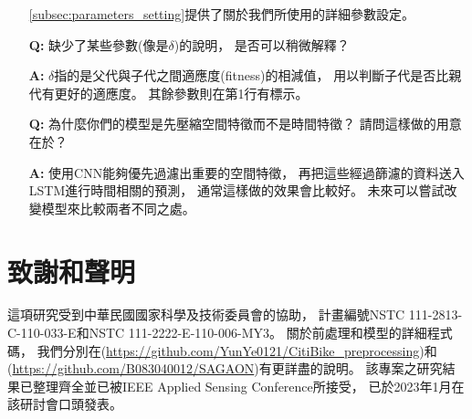 \documentclass[a4paper,14pt]{extarticle}
\begin{document}
\begin{itemize}
            \ref{subsec:parameters_setting}提供了關於我們所使用的詳細參數設定。
            \item [\textbf{Q:}]
            缺少了某些參數(像是$\delta$)的說明，
            是否可以稍微解釋？
            \item [\textbf{A:}]
            $\delta$指的是父代與子代之間適應度(fitness)的相減值，
            用以判斷子代是否比親代有更好的適應度。
            其餘參數則在第1行有標示。
            \item [\textbf{Q:}]
            為什麼你們的模型是先壓縮空間特徵而不是時間特徵？
            請問這樣做的用意在於？
            \item [\textbf{A:}]
            使用CNN能夠優先過濾出重要的空間特徵，
            再把這些經過篩濾的資料送入LSTM進行時間相關的預測，
            通常這樣做的效果會比較好。
            未來可以嘗試改變模型來比較兩者不同之處。
        \end{itemize}

    \newpage
    \section{致謝和聲明}
        
        這項研究受到中華民國國家科學及技術委員會的協助，
        計畫編號NSTC 111-2813-C-110-033-E和NSTC 111-2222-E-110-006-MY3。
        關於前處理和模型的詳細程式碼，
        我們分別在(\url{https://github.com/YunYe0121/CitiBike_preprocessing})和(\url{https://github.com/B083040012/SAGAON})有更詳盡的說明。
        該專案之研究結果已整理齊全並已被IEEE Applied Sensing Conference\cite{SAGAON}所接受，
        已於2023年1月在該研討會口頭發表。

    \clearpage
        \renewcommand\refname{\arabic{section}\hspace{1em}參考文獻}
        
        
\end{document}
